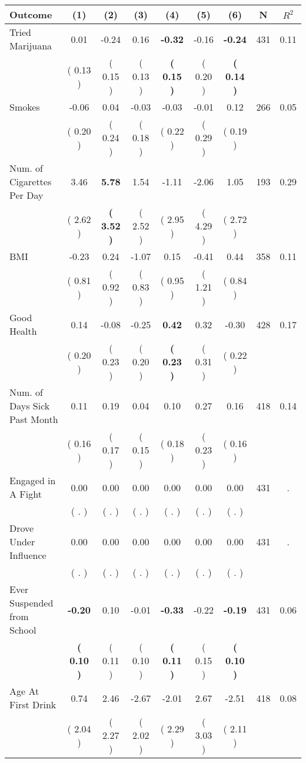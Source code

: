 \begin{tabular}{lcccccccc}
\toprule
 \textbf{Outcome} & \textbf{(1)} & \textbf{(2)} & \textbf{(3)} & \textbf{(4)} & \textbf{(5)} & \textbf{(6)} & \textbf{N} & \textbf{$ R^2$} \\
\midrule
Tried Marijuana &      0.01 &     -0.24 &      0.16 & \textbf{    -0.32} &     -0.16 & \textbf{    -0.24} & 431 &       0.11 \\ 
 & (     0.13 ) & (     0.15 ) & (     0.13 ) & \textbf{(     0.15 )} & (     0.20 ) & \textbf{(     0.14 )} & \\
Smokes &     -0.06 &      0.04 &     -0.03 &     -0.03 &     -0.01 &      0.12 & 266 &       0.05 \\ 
 & (     0.20 ) & (     0.24 ) & (     0.18 ) & (     0.22 ) & (     0.29 ) & (     0.19 ) & \\
Num. of Cigarettes Per Day &      3.46 & \textbf{     5.78} &      1.54 &     -1.11 &     -2.06 &      1.05 & 193 &       0.29 \\ 
 & (     2.62 ) & \textbf{(     3.52 )} & (     2.52 ) & (     2.95 ) & (     4.29 ) & (     2.72 ) & \\
BMI &     -0.23 &      0.24 &     -1.07 &      0.15 &     -0.41 &      0.44 & 358 &       0.11 \\ 
 & (     0.81 ) & (     0.92 ) & (     0.83 ) & (     0.95 ) & (     1.21 ) & (     0.84 ) & \\
Good Health &      0.14 &     -0.08 &     -0.25 & \textbf{     0.42} &      0.32 &     -0.30 & 428 &       0.17 \\ 
 & (     0.20 ) & (     0.23 ) & (     0.20 ) & \textbf{(     0.23 )} & (     0.31 ) & (     0.22 ) & \\
Num. of Days Sick Past Month &      0.11 &      0.19 &      0.04 &      0.10 &      0.27 &      0.16 & 418 &       0.14 \\ 
 & (     0.16 ) & (     0.17 ) & (     0.15 ) & (     0.18 ) & (     0.23 ) & (     0.16 ) & \\
Engaged in A Fight &      0.00 &      0.00 &      0.00 &      0.00 &      0.00 &      0.00 & 431 &          . \\ 
 & (        . ) & (        . ) & (        . ) & (        . ) & (        . ) & (        . ) & \\
Drove Under Influence &      0.00 &      0.00 &      0.00 &      0.00 &      0.00 &      0.00 & 431 &          . \\ 
 & (        . ) & (        . ) & (        . ) & (        . ) & (        . ) & (        . ) & \\
Ever Suspended from School & \textbf{    -0.20} &      0.10 &     -0.01 & \textbf{    -0.33} &     -0.22 & \textbf{    -0.19} & 431 &       0.06 \\ 
 & \textbf{(     0.10 )} & (     0.11 ) & (     0.10 ) & \textbf{(     0.11 )} & (     0.15 ) & \textbf{(     0.10 )} & \\
Age At First Drink &      0.74 &      2.46 &     -2.67 &     -2.01 &      2.67 &     -2.51 & 418 &       0.08 \\ 
 & (     2.04 ) & (     2.27 ) & (     2.02 ) & (     2.29 ) & (     3.03 ) & (     2.11 ) & \\
\bottomrule
\end{tabular}
